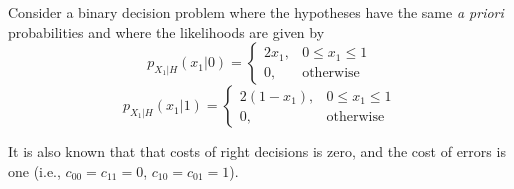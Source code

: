 \begin{solution}
\end{solution}

\else

\question Consider a binary decision problem where the hypotheses have the same {\em a priori} probabilities and where the likelihoods are given by
\[
p_{X_1|H}(x_1|0) = \left \{
  \begin{array}{cc}
    2x_1, & 0 \le x_1 \le 1\\
    0,    & \mbox{otherwise}
  \end{array}
\right.
\]
\[
p_{X_1|H}(x_1|1) = \left \{
  \begin{array}{cc}
    2(1-x_1), & 0 \le x_1 \le 1\\
    0, & \mbox{otherwise}
  \end{array}
\right.
\]

It is also known that that costs of right decisions is zero, and the cost of errors is one (i.e., $c_{00} = c_{11} =0$, $c_{10} = c_{01}=1$).

